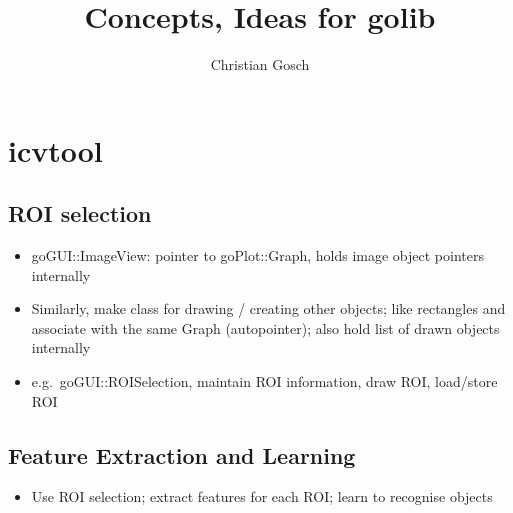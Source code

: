 \documentclass[a4paper,openbib,11pt]{article}
\author{Christian Gosch}
\title{Concepts, Ideas for golib}
\begin{document}

\maketitle

\section{icvtool}
\subsection{ROI selection}
\begin{itemize}
    \item goGUI::ImageView: pointer to goPlot::Graph, holds image object pointers internally
    \item Similarly, make class for drawing / creating other objects; like rectangles
        and associate with the same Graph (autopointer); also hold list of drawn objects
        internally
    \item e.g.~goGUI::ROISelection, maintain ROI information, draw ROI, load/store ROI
\end{itemize}
\subsection{Feature Extraction and Learning}
\begin{itemize}
    \item Use ROI selection; extract features for each ROI; learn to recognise objects
\end{itemize}

% 
\end{document}
